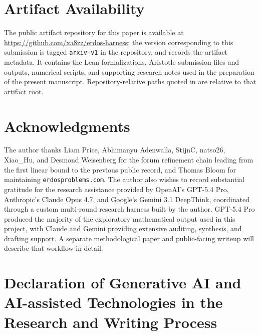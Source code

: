 \documentclass[11pt]{amsart}
\begin{document}
\section*{Artifact Availability}

\begin{sloppypar}
The public artifact repository for this paper is available at
\url{https://github.com/xa8zz/erdos-harness}; the version corresponding to
this submission is tagged \texttt{arxiv-v1} in the repository, and
\cite{ErdosHarness26} records the artifact metadata.  It contains the Lean formalizations, Aristotle submission files
and outputs, numerical scripts, and supporting research notes used in the
preparation of the present manuscript.  Repository-relative paths quoted in
 are relative to that artifact root.
\end{sloppypar}

\section*{Acknowledgments}

The author thanks Liam Price, Abhimanyu Adenwalla, StijnC, natso26, Xiao\_Hu,
and Desmond Weisenberg for the forum refinement chain leading from the first
linear bound to the previous public record, and Thomas Bloom for maintaining
\texttt{erdosproblems.com}.  The author also wishes to record substantial
gratitude for the research assistance provided by OpenAI's GPT-5.4 Pro,
Anthropic's Claude Opus 4.7, and Google's Gemini 3.1 DeepThink, coordinated
through a custom multi-round research harness built by the author.  GPT-5.4 Pro
produced the majority of the exploratory mathematical output used in this
project, with Claude and Gemini providing extensive auditing, synthesis, and
drafting support.  A separate methodological paper and public-facing writeup
will describe that workflow in detail.

\section*{Declaration of Generative AI and AI-assisted Technologies in the Research and Writing Process}
\end{document}
